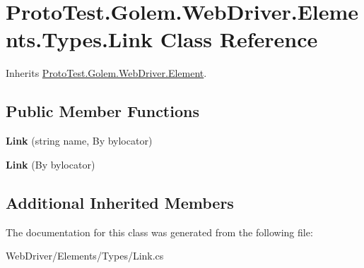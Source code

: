 \hypertarget{class_proto_test_1_1_golem_1_1_web_driver_1_1_elements_1_1_types_1_1_link}{\section{Proto\-Test.\-Golem.\-Web\-Driver.\-Elements.\-Types.\-Link Class Reference}
\label{class_proto_test_1_1_golem_1_1_web_driver_1_1_elements_1_1_types_1_1_link}
}


Inherits \hyperlink{class_proto_test_1_1_golem_1_1_web_driver_1_1_element}{Proto\-Test.\-Golem.\-Web\-Driver.\-Element}.

\subsection*{Public Member Functions}
\begin{DoxyCompactItemize}
\item 
\hypertarget{class_proto_test_1_1_golem_1_1_web_driver_1_1_elements_1_1_types_1_1_link_a87485a11e58282d99a81d3acd43c37d7}{{\bfseries Link} (string name, By bylocator)}\label{class_proto_test_1_1_golem_1_1_web_driver_1_1_elements_1_1_types_1_1_link_a87485a11e58282d99a81d3acd43c37d7}

\item 
\hypertarget{class_proto_test_1_1_golem_1_1_web_driver_1_1_elements_1_1_types_1_1_link_a39a76e7d63b8bf08ea27094e13742c88}{{\bfseries Link} (By bylocator)}\label{class_proto_test_1_1_golem_1_1_web_driver_1_1_elements_1_1_types_1_1_link_a39a76e7d63b8bf08ea27094e13742c88}

\end{DoxyCompactItemize}
\subsection*{Additional Inherited Members}


The documentation for this class was generated from the following file\-:\begin{DoxyCompactItemize}
\item 
Web\-Driver/\-Elements/\-Types/Link.\-cs\end{DoxyCompactItemize}
